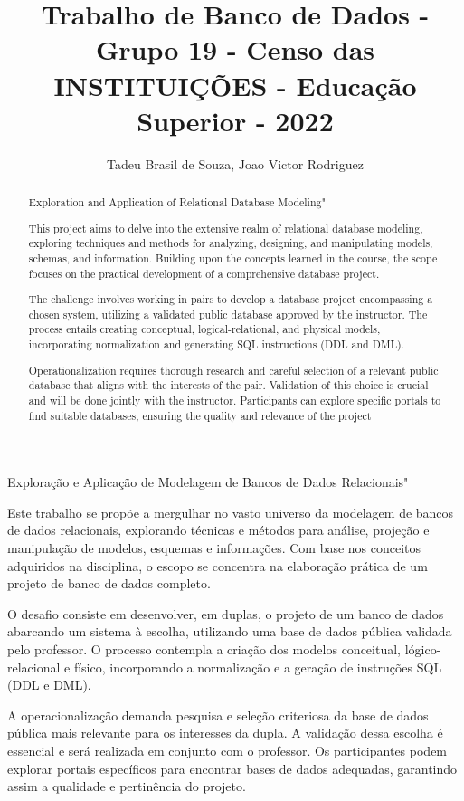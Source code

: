 \documentclass[12pt]{article}
\title{Trabalho de Banco de Dados - Grupo 19 - Censo das INSTITUIÇÕES - Educação Superior - 2022}
\author{Tadeu Brasil de Souza\inst{1}, Joao Victor Rodriguez\inst{1} }
\begin{document}
 

\maketitle

\begin{abstract}
 Exploration and Application of Relational Database Modeling"

This project aims to delve into the extensive realm of relational database modeling, exploring techniques and methods for analyzing, designing, and manipulating models, schemas, and information. Building upon the concepts learned in the course, the scope focuses on the practical development of a comprehensive database project.

The challenge involves working in pairs to develop a database project encompassing a chosen system, utilizing a validated public database approved by the instructor. The process entails creating conceptual, logical-relational, and physical models, incorporating normalization and generating SQL instructions (DDL and DML).

Operationalization requires thorough research and careful selection of a relevant public database that aligns with the interests of the pair. Validation of this choice is crucial and will be done jointly with the instructor. Participants can explore specific portals to find suitable databases, ensuring the quality and relevance of the project
\end{abstract}
     
\begin{resumo} 
  Exploração e Aplicação de Modelagem de Bancos de Dados Relacionais"

Este trabalho se propõe a mergulhar no vasto universo da modelagem de bancos de dados relacionais, explorando técnicas e métodos para análise, projeção e manipulação de modelos, esquemas e informações. Com base nos conceitos adquiridos na disciplina, o escopo se concentra na elaboração prática de um projeto de banco de dados completo.

O desafio consiste em desenvolver, em duplas, o projeto de um banco de dados abarcando um sistema à escolha, utilizando uma base de dados pública validada pelo professor. O processo contempla a criação dos modelos conceitual, lógico-relacional e físico, incorporando a normalização e a geração de instruções SQL (DDL e DML).

A operacionalização demanda pesquisa e seleção criteriosa da base de dados pública mais relevante para os interesses da dupla. A validação dessa escolha é essencial e será realizada em conjunto com o professor. Os participantes podem explorar portais específicos para encontrar bases de dados adequadas, garantindo assim a qualidade e pertinência do projeto.
\end{resumo}
\end{document}
